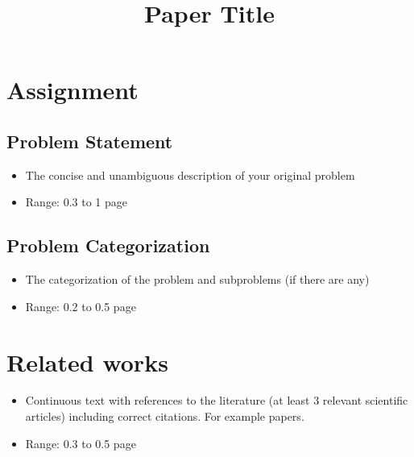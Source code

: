 \documentclass[onecolumn, conference]{IEEEtran}
\newcommand{\range}[2][0]{Range: #1 to #2 page}
\newcommand{\conciseItem}{\itemsep1pt \parskip0pt \parsep0pt}
\begin{document}
%
\title{Paper Title}


\author{
}

\maketitle

\section{Assignment}
\subsection{Problem Statement}
\begin{itemize}
	\conciseItem
	\item The concise and unambiguous description of your original problem
	\item \range[0.3]{1}
\end{itemize}
\subsection{Problem Categorization}
\begin{itemize}
	\conciseItem
	\item The categorization of the problem and subproblems (if there are any)
	\item \range[0.2]{0.5}
\end{itemize}

\section{Related works}
\begin{itemize}
	\conciseItem
	\item Continuous text with references to the literature (at least 3 relevant scientific articles) including correct citations. For example papers\cite{RW:Eason, RW:Clerk, RW:Jacobs, RW:Elissa, RW:Nicole}.
	\item \range[0.3]{0.5}
\end{itemize}
\end{document}
